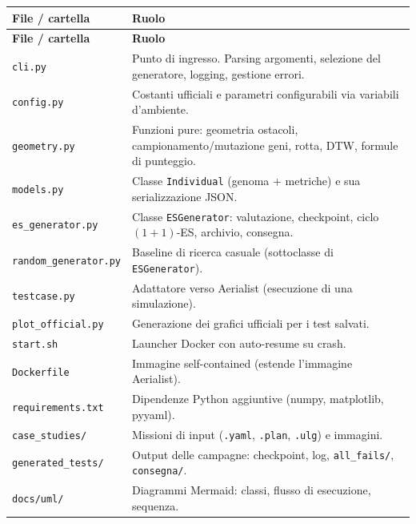 \documentclass[11pt,a4paper]{report}
\newcommand{\code}[1]{\texttt{#1}}
\begin{document}
\begin{longtable}{L{4.2cm} L{10cm}}
\toprule
\textbf{File / cartella} & \textbf{Ruolo}\\
\midrule
\endfirsthead
\toprule
\textbf{File / cartella} & \textbf{Ruolo}\\
\midrule
\endhead
\code{cli.py} & Punto di ingresso. Parsing argomenti, selezione del generatore, logging, gestione errori.\\
\code{config.py} & Costanti ufficiali e parametri configurabili via variabili d'ambiente.\\
\code{geometry.py} & Funzioni pure: geometria ostacoli, campionamento/mutazione geni, rotta, DTW, formule di punteggio.\\
\code{models.py} & Classe \code{Individual} (genoma + metriche) e sua serializzazione JSON.\\
\code{es\_generator.py} & Classe \code{ESGenerator}: valutazione, checkpoint, ciclo $(1+1)$-ES, archivio, consegna.\\
\code{random\_generator.py} & Baseline di ricerca casuale (sottoclasse di \code{ESGenerator}).\\
\code{testcase.py} & Adattatore verso Aerialist (esecuzione di una simulazione).\\
\code{plot\_official.py} & Generazione dei grafici ufficiali per i test salvati.\\
\code{start.sh} & Launcher Docker con auto-resume su crash.\\
\code{Dockerfile} & Immagine self-contained (estende l'immagine Aerialist).\\
\code{requirements.txt} & Dipendenze Python aggiuntive (numpy, matplotlib, pyyaml).\\
\code{case\_studies/} & Missioni di input (\code{.yaml}, \code{.plan}, \code{.ulg}) e immagini.\\
\code{generated\_tests/} & Output delle campagne: checkpoint, log, \code{all\_fails/}, \code{consegna/}.\\
\code{docs/uml/} & Diagrammi Mermaid: classi, flusso di esecuzione, sequenza.\\
\bottomrule
\end{longtable}
\end{document}
